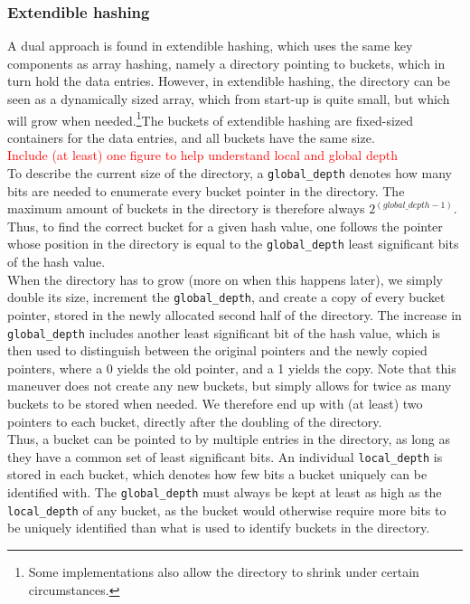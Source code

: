 \documentclass[11pt]{article} %
\begin{document}
\subsubsection{Extendible hashing}
A dual approach is found in extendible hashing, which uses the same key components as array hashing, namely a directory pointing to buckets, which in turn hold the data entries. However, in extendible hashing, the directory can be seen as a dynamically sized array, which from start-up is quite small, but which will grow when needed.\footnote{Some implementations also allow the directory to shrink under certain circumstances.}The buckets of extendible hashing are fixed-sized containers for the data entries, and all buckets have the same size. \\

\textcolor{red}{Include (at least) one figure to help understand local and global depth}\\

To describe the current size of the directory, a \verb|global_depth| denotes how many bits are needed to enumerate every bucket pointer in the directory. The maximum amount of buckets in the directory is therefore always $2^{(global\_depth-1)}$. Thus, to find the correct bucket for a given hash value, one follows the pointer whose position in the directory is equal to the \verb|global_depth| least significant bits of the hash value.\\

When the directory has to grow (more on when this happens later), we simply double its size, increment the \verb|global_depth|, and create a copy of every bucket pointer, stored in the newly allocated second half of the directory. The increase in \verb|global_depth| includes another least significant bit of the hash value, which is then used to distinguish between the original pointers and the newly copied pointers, where a 0 yields the old pointer, and a 1 yields the copy. Note that this maneuver does not create any new buckets, but simply allows for twice as many buckets to be stored when needed. We therefore end up with (at least) two pointers to each bucket, directly after the doubling of the directory.\\

Thus, a bucket can be pointed to by multiple entries in the directory, as long as they have a common set of least significant bits. An individual \verb|local_depth| is stored in each bucket, which denotes how few bits a bucket uniquely can be identified with. The \verb|global_depth| must always be kept at least as high as the \verb|local_depth| of any bucket, as the bucket would otherwise require more bits to be uniquely identified than what is used to identify buckets in the directory. \\
\end{document}

